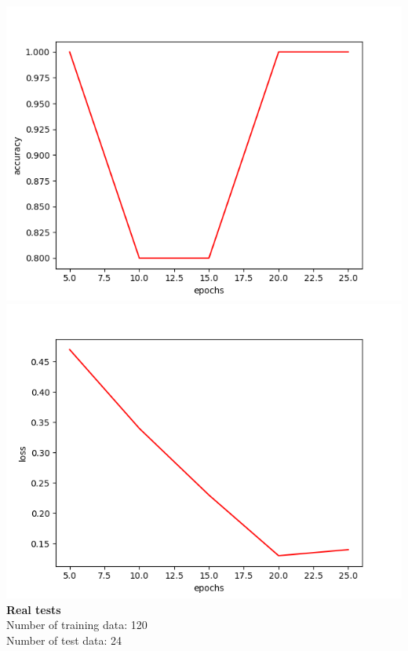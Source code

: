\documentclass[a4papaer,12pt]{article}
\begin{document}
\includegraphics[scale=0.5]{Accuracy-Epoch-Benchmark.png}
\includegraphics[scale=0.5]{Loss-Epochs-Benchmark.png}
\\
\indent \textbf{Real tests}
\\
Number of training data: 120
\\
Number of test data: 24
\\
\\
\end{document}
